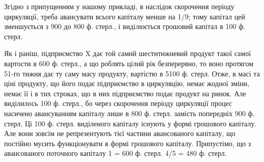 Згідно з припущенням у нашому прикладі, в наслідок скорочення періоду
циркуляції, треба авансувати всього капіталу менше на 1/9; тому
капітал цей зменшується з 900 до 800 ф. стерл., і виділюється грошовий
капітал в 100 ф. стерл.

Як і раніш, підприємство X дає той самий шеститижневий продукт такої
самої вартости в 600 ф. стерл., а що роблять цілий рік безперервно, то
воно протягом 51-го тижня дає ту саму масу продукту, вартістю в 5100 ф.
стерл. Отже, в масі та ціні продукту, що його подає підприємство в
циркуляцію, немає жодної зміни, немає її і в тих строках, що в них підприємство
подає продукт на ринок. Але виділилось 100 ф. стерл., бо
через скорочення періоду циркуляції процес насичено авансуванням капіталу
лише в 800 ф. стерл. замість попередніх 900 ф. стерл. Ці 100 ф.
стерл. виділеного капіталу існують у формі грошового капіталу. Але вони
зовсім не репрезентують тієї частини авансованого капіталу, що постійно
мусить функціонувати в формі грошового капіталу. Припустімо, що з
авансованого поточного капіталу 1 = 600 ф. стерл. 4/5 = 480 ф. стерл.
\parbreak{}  %
